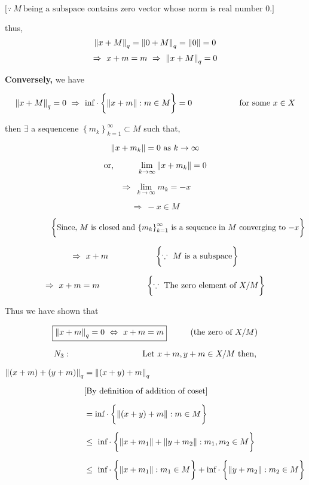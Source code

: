 \documentclass[a4paper,12pt]{article}
\begin{document}
    $\biggl[\because\  M\ \mbox{being a subspace contains  zero vector whose norm is real number 0.}\biggr]$

    \vspace*{0.2cm}

    thus, 
    \[\norm{x + M}_q = \norm{0 + M}_q = \norm{0} = 0\]
    \[\Rightarrow\ x + m = m\ \Rightarrow\ \norm{x +M}_q = 0\]

    {\bf Conversely,} we have

    \[\norm{x+M}_q = 0\ \Rightarrow\ \mbox{inf}\cdot \biggl\{\norm{x + m} : m\in M\biggr\} = 0  \hspace*{2cm} \mbox{for some $x\in X$}\]

    then $\exists$  a sequencene $\left\{m_k\right\}_{k=1}^{\infty}\subset M$ such that, 

    \[\norm{x + m_k} = 0\ \mbox{as}\ k\to \infty\]

    \[\mbox{or,} \hspace*{1cm}\lim_{k\to \infty} \norm{x + m_k} = 0\]

    \[\Rightarrow\ \lim_{k\to \infty} m_k = -x\]

    \[\Rightarrow\ -x\in M\] 
    
    \[\hspace*{2cm}\biggl\{\mbox{Since, $M$ is closed and $\left\{m_k\right\}_{k=1}^{\infty}$ is a sequence in $M$ converging to $-x$}\biggr\}\]

    \[\Rightarrow\ x + m\hspace*{2cm}\biggl\{\because\ M\  \mbox{is a subspace}\biggr\}\]

    \[\Rightarrow\ x + m = m\hspace*{2cm}\biggl\{\because\  \mbox{The zero element of}\ X/M\biggr\}\]

    Thus we have shown that 

    \[\boxed{\norm{x + m}_q = 0\ \Leftrightarrow\ x+m =m}\hspace*{1cm} (\mbox{the zero of}\  X/M)\]

    \vspace*{0.5cm}

    \[N_3:\hspace*{3cm} \mbox{Let}\  x + m, y+m\in X/M\ \mbox{then,}\]

    \begin{equation*}
        \begin{split}
            \norm{(x+m) + (y + m)}_q &  = \norm{(x+y) + m}_q\\[2mm]
            &[\mbox{By definition of addition of coset}]\\[2mm]
            & = \mbox{inf}\cdot \biggl\{\norm{(x + y) + m} : m\in M\biggr\}\\[2mm]
            &  \leq\ \mbox{inf}\cdot \biggl\{\norm{x + m_1} + \norm{y + m_2} : m_1, m_2\in M\biggr\}\\[2mm]
            & \leq\  \mbox{inf}\cdot \biggl\{\norm{x + m_1} : m_1\in M\biggr\} + \mbox{inf}\cdot \biggl\{\norm{y + m_2} : m_2\in M\biggr\}
        \end{split}
    \end{equation*}
\end{document}
